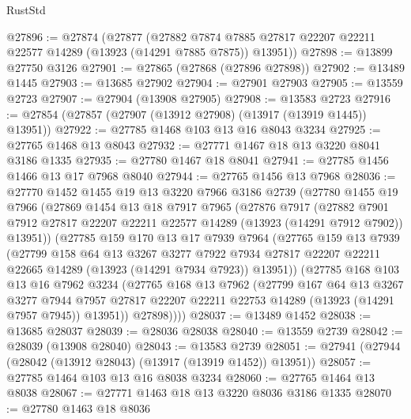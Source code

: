 \begin{lexlean}{RustStd}
\begin{coremodule}
@27896 := @27874
    (@27877
      (@27882 @7874 @7885 @27817 @22207 @22211 @22577 @14289 (@13923 (@14291 @7885 @7875)) @13951))
@27898 := @13899 @27750 @3126
@27901 := @27865 (@27868 (@27896 @27898))
@27902 := @13489 @1445
@27903 := @13685 @27902
@27904 := @27901 @27903
@27905 := @13559 @2723
@27907 := @27904 (@13908 @27905)
@27908 := @13583 @2723
@27916 := @27854 (@27857 (@27907 (@13912 @27908) (@13917 (@13919 @1445)) @13951))
@27922 := @27785 @1468 @103 @13 @16 @8043 @3234
@27925 := @27765 @1468 @13 @8043
@27932 := @27771 @1467 @18 @13 @3220 @8041 @3186 @1335
@27935 := @27780 @1467 @18 @8041
@27941 := @27785 @1456 @1466 @13 @17 @7968 @8040
@27944 := @27765 @1456 @13 @7968
@28036 := @27770
    @1452
    @1455
    @19
    @13
    @3220
    @7966
    @3186
    @2739
    (@27780
      @1455
      @19
      @7966
      (@27869
        @1454
        @13
        @18
        @7917
        @7965
        (@27876
          @7917
          (@27882
            @7901
            @7912
            @27817
            @22207
            @22211
            @22577
            @14289
            (@13923 (@14291 @7912 @7902))
            @13951))
        (@27785
          @159
          @170
          @13
          @17
          @7939
          @7964
          (@27765
            @159
            @13
            @7939
            (@27799
              @158
              @64
              @13
              @3267
              @3277
              @7922
              @7934
              @27817
              @22207
              @22211
              @22665
              @14289
              (@13923 (@14291 @7934 @7923))
              @13951))
          (@27785
            @168
            @103
            @13
            @16
            @7962
            @3234
            (@27765
              @168
              @13
              @7962
              (@27799
                @167
                @64
                @13
                @3267
                @3277
                @7944
                @7957
                @27817
                @22207
                @22211
                @22753
                @14289
                (@13923 (@14291 @7957 @7945))
                @13951))
            @27898))))
@28037 := @13489 @1452
@28038 := @13685 @28037
@28039 := @28036 @28038
@28040 := @13559 @2739
@28042 := @28039 (@13908 @28040)
@28043 := @13583 @2739
@28051 := @27941 (@27944 (@28042 (@13912 @28043) (@13917 (@13919 @1452)) @13951))
@28057 := @27785 @1464 @103 @13 @16 @8038 @3234
@28060 := @27765 @1464 @13 @8038
@28067 := @27771 @1463 @18 @13 @3220 @8036 @3186 @1335
@28070 := @27780 @1463 @18 @8036

\end{coremodule}
\end{lexlean}
